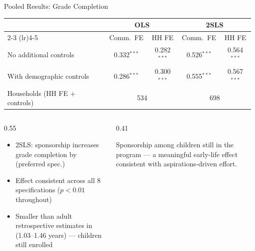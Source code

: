 \documentclass[aspectratio=169, 10pt]{beamer}
\begin{document}
\begin{frame}{Pooled Results: Grade Completion}
  \begin{center}
  \small
  \begin{tabular}{lcccc}
    \toprule
    & \multicolumn{2}{c}{\textbf{OLS}} & \multicolumn{2}{c}{\textbf{2SLS}} \\
    \cmidrule(lr){2-3} \cmidrule(lr){4-5}
    & Comm.\ FE & HH FE & Comm.\ FE & HH FE \\
    \midrule
    No additional controls     & 0.332$^{***}$ & 0.282$^{***}$ & 0.526$^{***}$ & 0.564$^{***}$ \\
    With demographic controls  & 0.286$^{***}$ & 0.300$^{***}$ & 0.555$^{***}$ & 0.567$^{***}$ \\
    \midrule
    Households (HH FE + controls) & \multicolumn{2}{c}{534} & \multicolumn{2}{c}{698} \\
    \bottomrule
  \end{tabular}
  \end{center}
  \vspace{0.3em}
  \begin{columns}
    \begin{column}{0.55\textwidth}
      \begin{itemize}
        \item 2SLS: sponsorship increases grade completion by  (preferred spec.)
        \item Effect consistent across all 8 specifications ($p < 0.01$ throughout)
        \item Smaller than adult retrospective estimates in \citealt{Wydick2013} (1.03--1.46 years) --- children still enrolled
      \end{itemize}
    \end{column}
    \begin{column}{0.41\textwidth}
      \begin{resultbox}
        Sponsorship  among children still in the program --- a meaningful early-life effect consistent with aspirations-driven effort.
      \end{resultbox}
    \end{column}
  \end{columns}
\end{frame}
\end{document}
